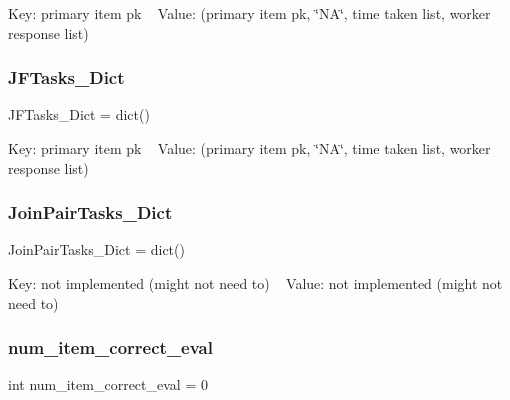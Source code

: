 Key\+: primary item pk ~\newline
 Value\+: (primary item pk, \char`\"{}\+N\+A\char`\"{}, time taken list, worker response list) 

\mbox{\label{classjoinapp_1_1join__simulations_1_1_join_simulation_a571ec14fa93c479a08bd16214270405d}} 
\subsubsection{\texorpdfstring{JFTasks\_Dict}{JFTasks\_Dict}}
{\footnotesize\ttfamily J\+F\+Tasks\+\_\+\+Dict = dict()\hspace{0.3cm}{\ttfamily [static]}}



Key\+: primary item pk ~\newline
 Value\+: (primary item pk, \char`\"{}\+N\+A\char`\"{}, time taken list, worker response list) 

\mbox{\label{classjoinapp_1_1join__simulations_1_1_join_simulation_aac74a0a6bd396765cc607a3362e7e334}} 
\subsubsection{\texorpdfstring{JoinPairTasks\_Dict}{JoinPairTasks\_Dict}}
{\footnotesize\ttfamily Join\+Pair\+Tasks\+\_\+\+Dict = dict()\hspace{0.3cm}{\ttfamily [static]}}



Key\+: not implemented (might not need to) ~\newline
 Value\+: not implemented (might not need to) 

\mbox{\label{classjoinapp_1_1join__simulations_1_1_join_simulation_ad8c60509c9ad950a377ff8e1c9f2d112}} 
\subsubsection{\texorpdfstring{num\_item\_correct\_eval}{num\_item\_correct\_eval}}
{\footnotesize\ttfamily int num\+\_\+item\+\_\+correct\+\_\+eval = 0\hspace{0.3cm}{\ttfamily [static]}}



